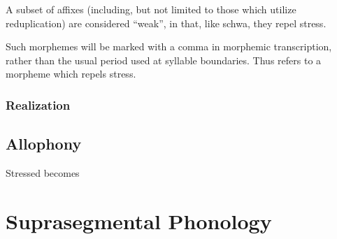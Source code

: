 A subset of affixes (including, but not limited to those which utilize reduplication) are considered ``weak'', in that, like schwa, they repel stress.

Such morphemes will be marked with a comma in morphemic transcription, rather than the usual period used at syllable boundaries. Thus  refers to a morpheme  which repels stress.

\subsection{Realization}

\section{Allophony}
Stressed  becomes 






\chapter{Suprasegmental Phonology}
